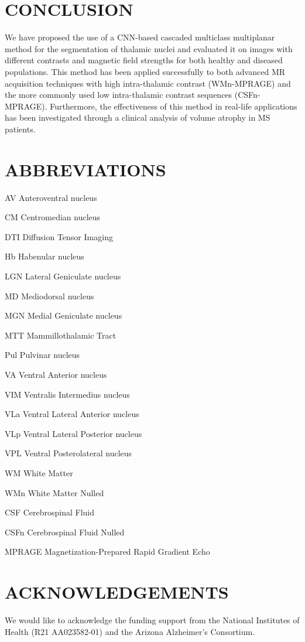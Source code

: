\section{CONCLUSION}
We have proposed the use of a CNN-based cascaded multiclass multiplanar method for the segmentation of thalamic nuclei and evaluated it on images with different contrasts and magnetic field strengths for both healthy and diseased populations. This method has been applied successfully to both advanced MR acquisition techniques with high intra-thalamic contrast (WMn-MPRAGE) and the more commonly used low intra-thalamic contrast sequences (CSFn-MPRAGE). Furthermore, the effectiveness of this method in real-life applications has been investigated through a clinical analysis of volume atrophy in MS patients. 
    
\section{ABBREVIATIONS}
AV Anteroventral nucleus

CM Centromedian nucleus 

DTI Diffusion Tensor Imaging 

Hb Habenular nucleus 

LGN Lateral Geniculate nucleus 

MD Mediodorsal nucleus 

MGN Medial Geniculate nucleus 

MTT Mammillothalamic Tract 

Pul Pulvinar nucleus 

VA Ventral Anterior nucleus 

VIM Ventralis Intermedius nucleus 

VLa Ventral Lateral Anterior nucleus 

VLp Ventral Lateral Posterior nucleus 

VPL Ventral Posterolateral nucleus 

WM White Matter 

WMn White Matter Nulled

CSF Cerebrospinal Fluid 

CSFn Cerebrospinal Fluid Nulled 

MPRAGE Magnetization-Prepared Rapid Gradient Echo 


\section{ACKNOWLEDGEMENTS} We would like to acknowledge the funding support from the National Institutes of Health (R21 AA023582-01) and the Arizona Alzheimer's Consortium. 






% 
